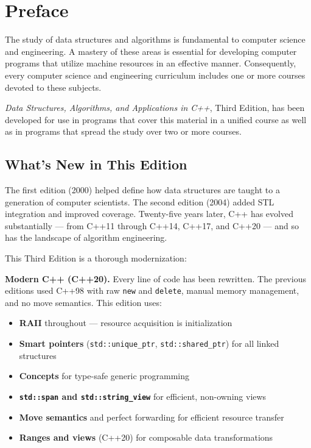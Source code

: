 \chapter{Preface}\label{preface:preface}

The study of data structures and algorithms is fundamental to computer science and engineering. A mastery of these areas is essential for developing computer programs that utilize machine resources in an effective manner. Consequently, every computer science and engineering curriculum includes one or more courses devoted to these subjects.

\textit{Data Structures, Algorithms, and Applications in C++}, Third Edition, has been developed for use in programs that cover this material in a unified course as well as in programs that spread the study over two or more courses.

\section{What's New in This Edition}

The first edition (2000) helped define how data structures are taught to a generation of computer scientists. The second edition (2004) added STL integration and improved coverage. Twenty-five years later, C++ has evolved substantially — from C++11 through C++14, C++17, and C++20 — and so has the landscape of algorithm engineering.

This Third Edition is a thorough modernization:

\textbf{Modern C++ (C++20).} Every line of code has been rewritten. The previous editions used C++98 with raw \texttt{new} and \texttt{delete}, manual memory management, and no move semantics. This edition uses:
\begin{itemize}
\item \textbf{RAII} throughout — resource acquisition is initialization
\item \textbf{Smart pointers} (\texttt{std::unique\_ptr}, \texttt{std::shared\_ptr}) for all linked structures
\item \textbf{Concepts} for type-safe generic programming
\item \textbf{\texttt{std::span} and \texttt{std::string\_view}} for efficient, non-owning views
\item \textbf{Move semantics} and perfect forwarding for efficient resource transfer
\item \textbf{Ranges and views} (C++20) for composable data transformations
\end{itemize}

